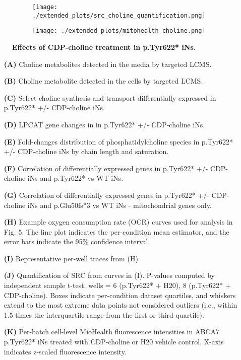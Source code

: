\begin{figure}[H]
\begin{subfigure}[t]{.25\textwidth}
    \end{subfigure}
    \begin{subfigure}[t]{.2\textwidth}
        \caption{}
        \texttt{[image: ./extended\_plots/src\_choline\_quantification.png]}        
    \end{subfigure}
    \begin{subfigure}[t]{.2\textwidth}
        \caption{}
        \texttt{[image: ./extended\_plots/mitohealth\_choline.png]}        
    \end{subfigure}
    \caption{
         \textbf{Effects of CDP-choline treatment in p.Tyr622* iNs.}\\
     }
     \label{fig:choline_treatment}
\end{figure}
\begin{itemize}
    \item[\textbf{(A)}] Choline metabolites detected in the media by targeted LCMS.
    \item[\textbf{(B)}] Choline metabolite detected in the cells by targeted LCMS.
    \item[\textbf{(C)}] Select choline synthesis and transport differentially expressed in p.Tyr622* +/- CDP-choline iNs.
    \item[\textbf{(D)}] LPCAT gene changes in in p.Tyr622* +/- CDP-choline iNs.
    \item[\textbf{(E)}] Fold-changes distribution of phosphatidylcholine species in p.Tyr622* +/- CDP-choline iNs by chain length and saturation.
    \item[\textbf{(F)}] Correlation of differentially expressed genes in p.Tyr622* +/- CDP-choline iNs and p.Tyr622* vs WT iNs.
    \item[\textbf{(G)}] Correlation of differentially expressed genes in p.Tyr622* +/- CDP-choline iNs and p.Glu50fs*3 vs WT iNs - mitochondrial genes only.
    \item[\textbf{(H)}] Example oxygen consumption rate (OCR) curves used for analysis in Fig. 5. The line plot indicates the per-condition mean estimator, and the error bars indicate the 95\% confidence interval. 
    \item[\textbf{(I)}] Representative per-well traces from (H).
    \item[\textbf{(J)}] Quantification of SRC from curves in (I). P-values computed by independent sample t-test.  wells = 6 (p.Tyr622* + H20), 8 (p.Tyr622* + CDP-choline). Boxes indicate per-condition dataset quartiles, and whiskers extend to the most extreme data points not considered outliers (i.e., within 1.5 times the interquartile range from the first or third quartile). 
    \item[\textbf{(K)}] Per-batch cell-level MioHealth fluorescence intensities in ABCA7 p.Tyr622* iNs treated with CDP-choline or H20 vehicle control. X-axis indicates z-scaled fluorescence intensity.
\end{itemize}